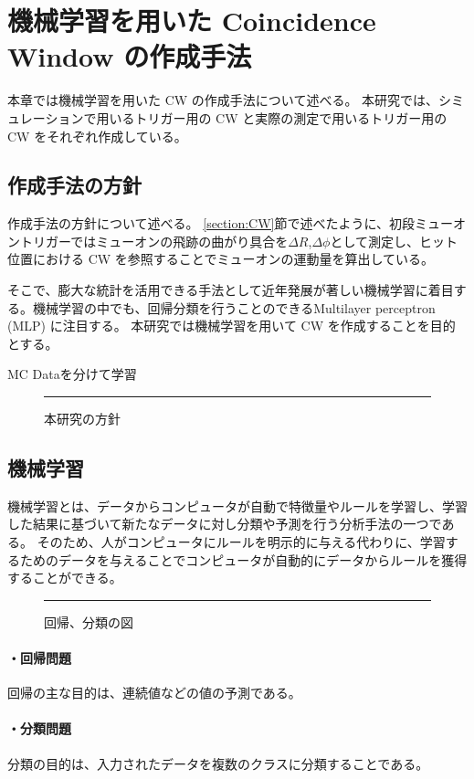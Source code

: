 \chapter{機械学習を用いた Coincidence Window の作成手法}
本章では機械学習を用いた CW の作成手法について述べる。
本研究では、シミュレーションで用いるトリガー用の CW と実際の測定で用いるトリガー用の CW をそれぞれ作成している。

\section{作成手法の方針}
作成手法の方針について述べる。
\ref{section:CW}節で述べたように、初段ミューオントリガーではミューオンの飛跡の曲がり具合を$\Delta R$,$\Delta \phi$として測定し、ヒット位置における CW を参照することでミューオンの運動量を算出している。


そこで、膨大な統計を活用できる手法として近年発展が著しい機械学習に着目する。機械学習の中でも、回帰分類を行うことのできるMultilayer perceptron (MLP) に注目する。
本研究では機械学習を用いて CW を作成することを目的とする。

MC Dataを分けて学習\\

\begin{figure}[tb]
  \centering
  \rule{8cm}{6cm}
  \caption{本研究の方針}
  \label{fig:fit_def}
\end{figure}

\section{機械学習}
機械学習とは、データからコンピュータが自動で特徴量やルールを学習し、学習した結果に基づいて新たなデータに対し分類や予測を行う分析手法の一つである。
そのため、人がコンピュータにルールを明示的に与える代わりに、学習するためのデータを与えることでコンピュータが自動的にデータからルールを獲得することができる。


\begin{figure}[tb]
  \centering
  \rule{8cm}{6cm}
  \caption{回帰、分類の図}
  \label{fig:fit_def}
\end{figure}

\subsubsection{・回帰問題}
回帰の主な目的は、連続値などの値の予測である。

\subsubsection{・分類問題}
分類の目的は、入力されたデータを複数のクラスに分類することである。



